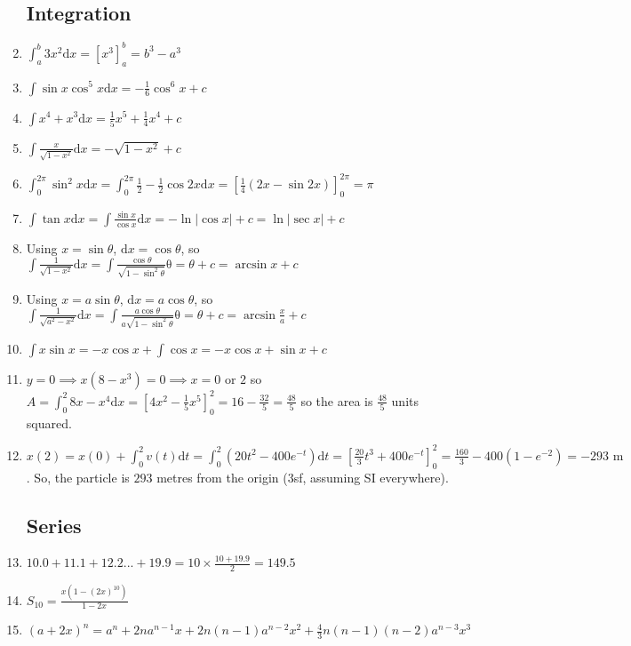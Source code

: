 \documentclass{article}
\begin{document}
\begin{enumerate}
\subsection{Integration}
    \item $\int_{a}^{b} 3x^2 \mathrm{d}x=[x^3]_{a}^{b}=b^3-a^3$
    \item $\int \sin{x} \cos^5{x} \mathrm{d} x= -\frac{1}{6} \cos^6{x} + c$
    \item $\int x^4 + x^3 \mathrm{d} x = \frac{1}{5}x^5 + \frac{1}{4} x^4 + c$
    \item $\int \frac{x}{\sqrt{1-x^2}} \mathrm{d} x=-\sqrt{1-x^2}+c$
    \item $\int_{0}^{2\pi} \sin^2{x} \mathrm{d} x= \int_{0}^{2\pi} \frac{1}{2} - \frac{1}{2}\cos{2x} \mathrm{d} x = [\frac{1}{4}(2x-\sin{2x})]_0^{2\pi}=\pi$
    \item $\int \tan{x} \mathrm{d}x = \int \frac{\sin{x}}{\cos{x}} \mathrm{d} x = -\ln{|\cos{x}|} + c = \ln{|\sec{x}|} + c$
    \item Using $x=\sin{\theta}$, $\mathrm{d} x = \cos{\theta}$, so $\int \frac{1}{\sqrt{1-x^2}} \mathrm{d}x =\int \frac{\cos{\theta}}{\sqrt{1-\sin^2{\theta}}} \mathrm{\theta} = \theta + c = \arcsin{x}+c$
    \item Using $x=a\sin{\theta}$, $\mathrm{d} x = a\cos{\theta}$, so $\int \frac{1}{\sqrt{a^2-x^2}} \mathrm{d}x =\int \frac{a\cos{\theta}}{a\sqrt{1-\sin^2{\theta}}} \mathrm{\theta} = \theta + c = \arcsin{\frac{x}{a}}+c$
    \item $\int x \sin{x} = -x \cos{x} + \int \cos{x} = -x \cos{x} + \sin{x} +c$
    \item $y=0 \implies x(8-x^3)=0 \implies x=0 \text{ or } 2$ so $A=\int_{0}^{2} 8x-x^4 \mathrm{d}x=[4x^2 - \frac{1}{5} x^5]_0^2=16-\frac{32}{5}=\frac{48}{5}$ so the area is $\frac{48}{5}$ units squared.
    \item $x(2)=x(0)+\int_{0}^{2}v(t) \mathrm{d}t = \int_{0}^{2} (20t^2 - 400 e^{-t}) \mathrm{d}t=[\frac{20}{3}t^3+400e^{-t}]_0^2=\frac{160}{3} - 400 (1-e^{-2})= -293 \text{ m}$. So, the particle is $293$ metres from the origin (3sf, assuming SI everywhere).
\subsection{Series}
    \item $10.0 + 11.1 + 12.2 ... + 19.9 = 10 \times \frac{10+19.9}{2}=149.5$
    \item $S_10 = \frac{x(1-(2x)^10)}{1-2x}$
    \item $(a+2x)^n = a^n + 2na^{n-1} x + 2n(n-1) a^{n-2} x^2 + \frac{4}{3} n(n-1)(n-2) a^{n-3} x^3$

\end{enumerate}
\end{document}
